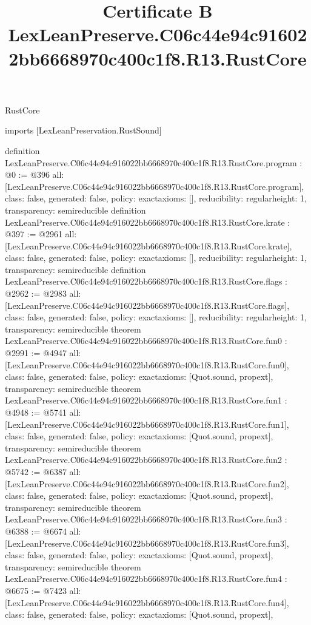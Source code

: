 \begin{lexlean}{RustCore}
\title{Certificate B LexLeanPreserve.C06c44e94c916022bb6668970c400c1f8.R13.RustCore}
\begin{coremodule}
imports [LexLeanPreservation.RustSound]

definition LexLeanPreserve.C06c44e94c916022bb6668970c400c1f8.R13.RustCore.program : @0 := @396 {
  all: [LexLeanPreserve.C06c44e94c916022bb6668970c400c1f8.R13.RustCore.program],
  class: false,
  generated: false,
  policy: exact{axioms: []},
  reducibility: regular{height: 1},
  transparency: semireducible
}
definition LexLeanPreserve.C06c44e94c916022bb6668970c400c1f8.R13.RustCore.krate : @397 := @2961 {
  all: [LexLeanPreserve.C06c44e94c916022bb6668970c400c1f8.R13.RustCore.krate],
  class: false,
  generated: false,
  policy: exact{axioms: []},
  reducibility: regular{height: 1},
  transparency: semireducible
}
definition LexLeanPreserve.C06c44e94c916022bb6668970c400c1f8.R13.RustCore.flags : @2962 := @2983 {
  all: [LexLeanPreserve.C06c44e94c916022bb6668970c400c1f8.R13.RustCore.flags],
  class: false,
  generated: false,
  policy: exact{axioms: []},
  reducibility: regular{height: 1},
  transparency: semireducible
}
theorem LexLeanPreserve.C06c44e94c916022bb6668970c400c1f8.R13.RustCore.fun0 : @2991 := @4947 {
  all: [LexLeanPreserve.C06c44e94c916022bb6668970c400c1f8.R13.RustCore.fun0],
  class: false,
  generated: false,
  policy: exact{axioms: [Quot.sound, propext]},
  transparency: semireducible
}
theorem LexLeanPreserve.C06c44e94c916022bb6668970c400c1f8.R13.RustCore.fun1 : @4948 := @5741 {
  all: [LexLeanPreserve.C06c44e94c916022bb6668970c400c1f8.R13.RustCore.fun1],
  class: false,
  generated: false,
  policy: exact{axioms: [Quot.sound, propext]},
  transparency: semireducible
}
theorem LexLeanPreserve.C06c44e94c916022bb6668970c400c1f8.R13.RustCore.fun2 : @5742 := @6387 {
  all: [LexLeanPreserve.C06c44e94c916022bb6668970c400c1f8.R13.RustCore.fun2],
  class: false,
  generated: false,
  policy: exact{axioms: [Quot.sound, propext]},
  transparency: semireducible
}
theorem LexLeanPreserve.C06c44e94c916022bb6668970c400c1f8.R13.RustCore.fun3 : @6388 := @6674 {
  all: [LexLeanPreserve.C06c44e94c916022bb6668970c400c1f8.R13.RustCore.fun3],
  class: false,
  generated: false,
  policy: exact{axioms: [Quot.sound, propext]},
  transparency: semireducible
}
theorem LexLeanPreserve.C06c44e94c916022bb6668970c400c1f8.R13.RustCore.fun4 : @6675 := @7423 {
  all: [LexLeanPreserve.C06c44e94c916022bb6668970c400c1f8.R13.RustCore.fun4],
  class: false,
  generated: false,
  policy: exact{axioms: [Quot.sound, propext]},
}
\end{coremodule}
\end{lexlean}
